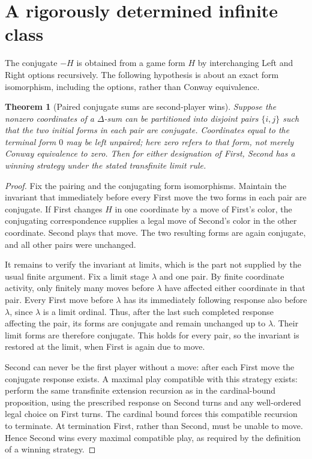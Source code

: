 \documentclass[11pt]{article}
\newtheorem{theorem}{Theorem}
\theoremstyle{definition}
\begin{document}
\section*{A rigorously determined infinite class}
The conjugate $-H$ is obtained from a game form $H$ by interchanging Left and Right options recursively. The following hypothesis is about an exact form isomorphism, including the options, rather than Conway equivalence.

\begin{theorem}[Paired conjugate sums are second-player wins]
Suppose the nonzero coordinates of a $\Delta$-sum can be partitioned into disjoint pairs $\{i,j\}$ such that the two initial forms in each pair are conjugate. Coordinates equal to the terminal form $0$ may be left unpaired; here zero refers to that form, not merely Conway equivalence to zero. Then for either designation of First, Second has a winning strategy under the stated transfinite limit rule.
\end{theorem}
\begin{proof}
Fix the pairing and the conjugating form isomorphisms. Maintain the invariant that immediately before every First move the two forms in each pair are conjugate. If First changes $H$ in one coordinate by a move of First's color, the conjugating correspondence supplies a legal move of Second's color in the other coordinate. Second plays that move. The two resulting forms are again conjugate, and all other pairs were unchanged.

It remains to verify the invariant at limits, which is the part not supplied by the usual finite argument. Fix a limit stage $\lambda$ and one pair. By finite coordinate activity, only finitely many moves before $\lambda$ have affected either coordinate in that pair. Every First move before $\lambda$ has its immediately following response also before $\lambda$, since $\lambda$ is a limit ordinal. Thus, after the last such completed response affecting the pair, its forms are conjugate and remain unchanged up to $\lambda$. Their limit forms are therefore conjugate. This holds for every pair, so the invariant is restored at the limit, when First is again due to move.

Second can never be the first player without a move: after each First move the conjugate response exists. A maximal play compatible with this strategy exists: perform the same transfinite extension recursion as in the cardinal-bound proposition, using the prescribed response on Second turns and any well-ordered legal choice on First turns. The cardinal bound forces this compatible recursion to terminate. At termination First, rather than Second, must be unable to move. Hence Second wins every maximal compatible play, as required by the definition of a winning strategy.
\end{proof}
\end{document}
